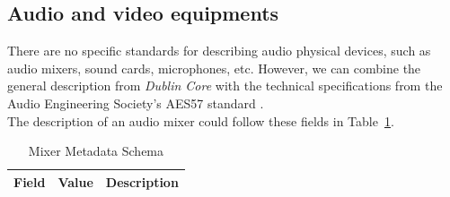 \subsection{Audio and video equipments}
There are no specific standards for describing audio physical devices, such as audio mixers, sound cards, microphones, etc. However, we can combine the general description from \textit{Dublin Core} with the technical specifications from the Audio Engineering Society's AES57 standard \cite{AES57}.\\
The description of an audio mixer could follow these fields in Table~\ref{tab:c4-mixer}.

\begin{longtable}{|p{}|p{}|p{}|}
    \caption{Mixer Metadata Schema} \label{tab:c4-mixer} \\
    \hline
    \textbf{Field} & \textbf{Value} & \textbf{Description} \\
    \hline


\end{longtable}
